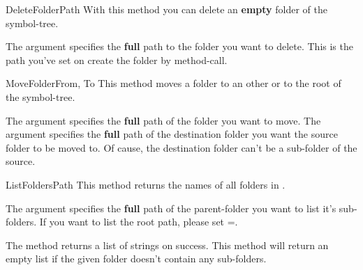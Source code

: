 \begin{methoddesc}[System]{DeleteFolder}{Path}
With this method you can delete an \textbf{empty} folder of the symbol-tree.

The argument  specifies the \textbf{full} path to the folder you want to
delete. This is the path you've set on create the folder by 
 method-call.
\end{methoddesc}


\begin{methoddesc}[System]{MoveFolder}{From, To}
This method moves a folder to an other or to the root of the symbol-tree.

The argument  specifies the \textbf{full} path of the folder you want
to move. The argument  specifies the \textbf{full} path of the destination 
folder you want the source folder to be moved to. Of cause, the destination folder
can't be a sub-folder of the source.
\end{methoddesc}


\begin{methoddesc}[System]{ListFolders}{Path}
This method returns the names of all folders in .

The argument  specifies the \textbf{full} path of the parent-folder
you want to list it's sub-folders. If you want to list the root path, please 
set =.

The method returns a list of strings on success. This method will return an 
empty list if the given folder doesn't contain any sub-folders.
\end{methoddesc}


